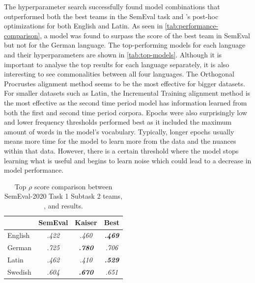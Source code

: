 The hyperparameter search successfully found model combinations that outperformed both the best teams in the SemEval task and \citet{kaiser-etal-2020-ims}’s post-hoc optimizations for both English and Latin. As seen in \autoref{tab:performance-comparison}, a model was found to surpass the score of the best team in SemEval but not \citet{kaiser-etal-2020-ims} for the German language. The top-performing models for each language and their hyperparameters are shown in \autoref{tab:top-models}. Although it is important to analyse the top results for each language separately, it is also interesting to see commonalities between all four languages. The Orthogonal Procrustes alignment method seems to be the most effective for bigger datasets. For smaller datasets such as Latin, the Incremental Training alignment method is the most effective as the second time period model has information learned from both the first and second time period corpora. Epochs were also surprisingly low and lower frequency thresholds performed best as it included the maximum amount of words in the model’s vocabulary. Typically, longer epochs usually means more time for the model to learn more from the data and the nuances within that data. However, there is a certain threshold where the model stops learning what is useful and begins to learn noise which could lead to a decrease in model performance. 

\begin{table}
\centering
\begin{tabular}{|l|c|c|c|} 
\cline{2-4}
\multicolumn{1}{l|}{\textbf{ }} & \textbf{SemEval } & \textbf{Kaiser }         & \textbf{Best }            \\ 
\hline
English                         & \textit{ .422 }   & \textit{ .460 }          & \textbf{\textit{ .469 }}  \\ 
\hline
German                          & \textit{ .725 }   & \textit{\textbf{ .780 }} & \textit{ .706 }           \\ 
\hline
Latin                           & \textit{ .462 }   & \textit{ .410 }          & \textbf{\textit{ .529 }}  \\ 
\hline
Swedish                         & \textit{ .604 }   & \textit{\textbf{ .670 }} & \textit{ .651 }           \\
\hline
\end{tabular}
\caption{Top $\rho$ score comparison between SemEval-2020 Task 1 Subtask 2 teams, \citet{kaiser-etal-2020-ims}, and results.}
\label{tab:performance-comparison}
\end{table}


